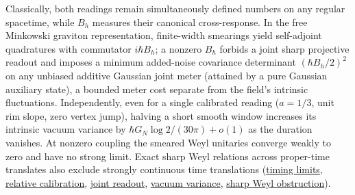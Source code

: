 \documentclass[10pt,a4paper]{article}
\numberwithin{equation}{section}
\newcommand{\repo}[2]{\href{https://github.com/sprajs/quantum-gravity/blob/main/#1}{#2}}
\begin{document}
Classically, both readings remain simultaneously defined numbers on any regular spacetime, while $B_h$ measures their canonical cross-response. In the free Minkowski graviton representation, finite-width smearings yield self-adjoint quadratures with commutator $i\hbar B_h$; a nonzero $B_h$ forbids a joint sharp projective readout and imposes a minimum added-noise covariance determinant $(\hbar B_h/2)^2$ on any unbiased additive Gaussian joint meter (attained by a pure Gaussian auxiliary state), a bounded meter cost separate from the field's intrinsic fluctuations. Independently, even for a single calibrated reading ($a=1/3$, unit rim slope, zero vertex jump), halving a short smooth window increases its intrinsic vacuum variance by $\hbar G_N\log 2/(30\pi)+o(1)$ as the duration vanishes. At nonzero coupling the smeared Weyl unitaries converge weakly to zero and have no strong limit. Exact sharp Weyl relations across proper-time translates also exclude strongly continuous time translations (\repo{audit/timing-midpoint.md}{timing limits}, \repo{audit/timing-protocol.md}{relative calibration}, \repo{audit/timing-readout.md}{joint readout}, \repo{audit/timing-quantum.md}{vacuum variance}, \repo{audit/timing-algebra.md}{sharp Weyl obstruction}).
\end{document}
